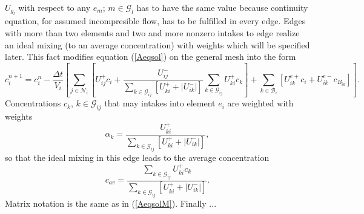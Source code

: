 $U_{g_{l}}$ with respect to any $e_m$; $m \in \mathcal{G}_{l}$ has to have the same value because continuity equation, for assumed incompresible flow, has to
 be fulfilled in every edge. Edges with more than two elements and two and more nonzero intakes to edge realize an ideal mixing (to an average concentration) 
with weights which will be specified later. This fact modifies equation (\ref{Aeqsol}) on the general mesh into the form
    \begin{equation}
      c_i^{n+1} = c_i^n - \frac{\Delta t}{V_{i}} \left[ \sum_{j \in \mathcal{N}_{i}} \left[ U_{ij}^{+} c_i +  \frac{U_{ij}^{-}}{\sum\limits_{k \in \mathcal{G}_{ij}}
      \left[ U_{ki}^{+} + |U_{ik}^{-}| \right] } \sum\limits_{k \in \mathcal{G}_{ij}} U_{ki}^{+} c_{k} \right] + 
      \sum_{k \in \mathcal{B}_{i}}  \left[  U_{ik}^{e+} c_i +  U_{ik}^{e-} c_{B_{ik}} \right] \right]. \label{Aeqsol}
    \end{equation}
Concentrations $c_k$, $k \in \mathcal{G}_{ij}$ that may intakes into element $e_i$ are weighted with weights 
\begin{equation}
 \alpha_k = \frac{U_{ki}^{+}}{\sum\limits_{k \in \mathcal{G}_{ij}} \left[ U_{ki}^{+} + |U_{ik}^{-}| \right] }, \label{weights}
\end{equation}
so that the ideal mixing in this edge leads to the average concentration 
\begin{equation}
 c_{av} = \frac{\sum\limits_{k \in \mathcal{G}_{ij}} U_{ki}^{+} c_{k}}{\sum\limits_{k \in \mathcal{G}_{ij}} \left[ U_{ki}^{+} + |U_{ik}^{-}| \right] }. \label{cav}
\end{equation}
Matrix notation is the same as in (\ref{AeqsolM}). Finally ...